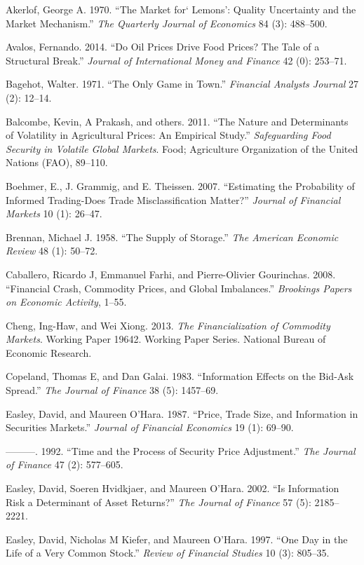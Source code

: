 \documentclass[]{elsarticle} %
\begin{document}
Akerlof, George A. 1970. ``The Market for` Lemons': Quality Uncertainty
and the Market Mechanism.'' \emph{The Quarterly Journal of Economics} 84
(3): 488--500.

Avalos, Fernando. 2014. ``Do Oil Prices Drive Food Prices? The Tale of a
Structural Break.'' \emph{Journal of International Money and Finance} 42
(0): 253--71.

Bagehot, Walter. 1971. ``The Only Game in Town.'' \emph{Financial
Analysts Journal} 27 (2): 12--14.

Balcombe, Kevin, A Prakash, and others. 2011. ``The Nature and
Determinants of Volatility in Agricultural Prices: An Empirical Study.''
\emph{Safeguarding Food Security in Volatile Global Markets}. Food;
Agriculture Organization of the United Nations (FAO), 89--110.

Boehmer, E., J. Grammig, and E. Theissen. 2007. ``Estimating the
Probability of Informed Trading-Does Trade Misclassification Matter?''
\emph{Journal of Financial Markets} 10 (1): 26--47.

Brennan, Michael J. 1958. ``The Supply of Storage.'' \emph{The American
Economic Review} 48 (1): 50--72.

Caballero, Ricardo J, Emmanuel Farhi, and Pierre-Olivier Gourinchas.
2008. ``Financial Crash, Commodity Prices, and Global Imbalances.''
\emph{Brookings Papers on Economic Activity}, 1--55.

Cheng, Ing-Haw, and Wei Xiong. 2013. \emph{The Financialization of
Commodity Markets}. Working Paper 19642. Working Paper Series. National
Bureau of Economic Research.

Copeland, Thomas E, and Dan Galai. 1983. ``Information Effects on the
Bid-Ask Spread.'' \emph{The Journal of Finance} 38 (5): 1457--69.

Easley, David, and Maureen O'Hara. 1987. ``Price, Trade Size, and
Information in Securities Markets.'' \emph{Journal of Financial
Economics} 19 (1): 69--90.

---------. 1992. ``Time and the Process of Security Price Adjustment.''
\emph{The Journal of Finance} 47 (2): 577--605.

Easley, David, Soeren Hvidkjaer, and Maureen O'Hara. 2002. ``Is
Information Risk a Determinant of Asset Returns?'' \emph{The Journal of
Finance} 57 (5): 2185--2221.

Easley, David, Nicholas M Kiefer, and Maureen O'Hara. 1997. ``One Day in
the Life of a Very Common Stock.'' \emph{Review of Financial Studies} 10
(3): 805--35.
\end{document}
